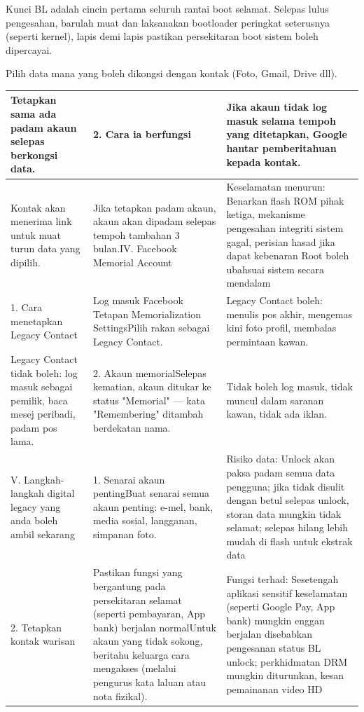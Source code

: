 
Kunci BL adalah cincin pertama seluruh rantai boot selamat. Selepas lulus pengesahan, barulah muat dan laksanakan bootloader peringkat seterusnya (seperti kernel), lapis demi lapis pastikan persekitaran boot sistem boleh dipercayai.


Pilih data mana yang boleh dikongsi dengan kontak (Foto, Gmail, Drive dll).

\begin{center}
\begin{tabularx}{\linewidth}{|X|X|X|}
\hline
\textbf{Tetapkan sama ada padam akaun selepas berkongsi data.} & \textbf{2. Cara ia berfungsi} & \textbf{Jika akaun tidak log masuk selama tempoh yang ditetapkan, Google hantar pemberitahuan kepada kontak.} \tabularnewline
\hline
Kontak akan menerima link untuk muat turun data yang dipilih. & Jika tetapkan padam akaun, akaun akan dipadam selepas tempoh tambahan 3 bulan.\newline IV. Facebook Memorial Account & Keselamatan menurun: Benarkan flash ROM pihak ketiga, mekanisme pengesahan integriti sistem gagal, perisian hasad jika dapat kebenaran Root boleh ubahsuai sistem secara mendalam \tabularnewline
1. Cara menetapkan Legacy Contact & Log masuk Facebook Tetapan Memorialization Settings\newline Pilih rakan sebagai Legacy Contact. & Legacy Contact boleh: menulis pos akhir, mengemas kini foto profil, membalas permintaan kawan. \tabularnewline
Legacy Contact tidak boleh: log masuk sebagai pemilik, baca mesej peribadi, padam pos lama. & 2. Akaun memorial\newline Selepas kematian, akaun ditukar ke status "Memorial" — kata "Remembering" ditambah berdekatan nama. & Tidak boleh log masuk, tidak muncul dalam saranan kawan, tidak ada iklan. \tabularnewline
V. Langkah-langkah digital legacy yang anda boleh ambil sekarang & 1. Senarai akaun penting\newline Buat senarai semua akaun penting: e-mel, bank, media sosial, langganan, simpanan foto. & Risiko data: Unlock akan paksa padam semua data pengguna; jika tidak disulit dengan betul selepas unlock, storan data mungkin tidak selamat; selepas hilang lebih mudah di flash untuk ekstrak data \tabularnewline
2. Tetapkan kontak warisan & Pastikan fungsi yang bergantung pada persekitaran selamat (seperti pembayaran, App bank) berjalan normal\newline Untuk akaun yang tidak sokong, beritahu keluarga cara mengakses (melalui pengurus kata laluan atau nota fizikal). & Fungsi terhad: Sesetengah aplikasi sensitif keselamatan (seperti Google Pay, App bank) mungkin enggan berjalan disebabkan pengesanan status BL unlock; perkhidmatan DRM mungkin diturunkan, kesan pemainanan video HD \tabularnewline
\hline
\end{tabularx}
\end{center}

